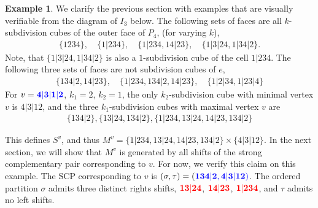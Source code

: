\documentclass{amsart}
\newcommand{\red}{\color{red}} %
\newcommand{\blue}{\color{blue}} %
\theoremstyle{definition}
\newtheorem{example}[theorem]{Example}
\newcommand{\SCP}{\mathrm{SCP}}
\newcommand{\subdivpairsv}{S^v}
\newcommand{\maxsubdivpairsv}{M^v}
\begin{document}
\begin{example}\label{ex:subdivision cubes}
We clarify the previous section with examples that are visually verifiable from the diagram of $I_3$ below.
The following sets of faces are all $k$-subdivision cubes of the outer face of $P_4$, (for varying $k$),
\begin{align*}
    \{1234\},\quad \{1|234\},\quad \{1|234, 14|23\},\quad \{1|3|24,1|34|2\}.
\end{align*}
Note, that $\{1|3|24,1|34|2\}$ is also a $1$-subdivision cube of the cell $1|234$.
The following three sets of faces are not subdivision cubes of $e$,
\begin{align*}
    \{134|2, 14|23\},\quad \{1|234, 134|2, 14|23\}, \quad \{1|2|34,1|23|4\}
\end{align*}
For $v = \blue{\mathbf{4|3|1|2}}$, $k_1=2$, $k_2=1$, the only $k_2$-subdivision cube with minimal vertex $v$ is $4|3|12$, and the three $k_1$-subdivision cubes with maximal vertex $v$ are
\begin{align*}
    \{134|2\}, \{13|24, 134|2\}, \{ 1|234, 13|24, 14|23, 134|2\}
\end{align*}

This defines $\subdivpairsv$, and thus $\maxsubdivpairsv=\{ 1|234, 13|24, 14|23, 134|2\} \times \{4|3|12\}$.
In the next section, we will show that $\maxsubdivpairsv$ is generated by all shifts of the strong complementary pair corresponding to $v$.
For now, we verify this claim on this example.
The $\SCP$ corresponding to $v$ is $(\sigma,\tau) = (\blue{\mathbf{134|2}},\blue{\mathbf{4|3|12}} )$.
The ordered partition $\sigma$ admits three distinct rights shifts, $\red{\mathbf{13|24}}$, $\red{\mathbf{14|23}}$, $\red{\mathbf{1|234}}$, and $\tau$ admits no left shifts.


\end{example}
\end{document}
